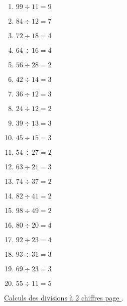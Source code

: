 \begin{enumerate}[label=C\arabic*)]
    \item \(99 \div 11 =  9\)
    \item \(84 \div 12 = 7\)
    \item \(72 \div 18 = 4\)
    \item \(64 \div 16 = 4\)
    \item \(56 \div 28 = 2\)
    \item \(42 \div 14 = 3\)
    \item \(36 \div 12 = 3\)
    \item \(24 \div 12 = 2\)
    \item \(39 \div 13 = 3\)
    \item \(45 \div 15 = 3\)
    \item \(54 \div 27 =  2\)
    \item \(63 \div 21 = 3\)
    \item \(74 \div 37 = 2\)
    \item \(82 \div 41 = 2\)
    \item \(98 \div 49 = 2\)
    \item \(80 \div 20 = 4\)
    \item \(92 \div 23 = 4\)
    \item \(93 \div 31 = 3\)
    \item \(69 \div 23 = 3\)
    \item \(55 \div 11 = 5\)
\end{enumerate}


\hyperref[calc:niveau6]{Calculs des divisions à 2 chiffres page \pageref{calc:niveau6}}.


\newpage


